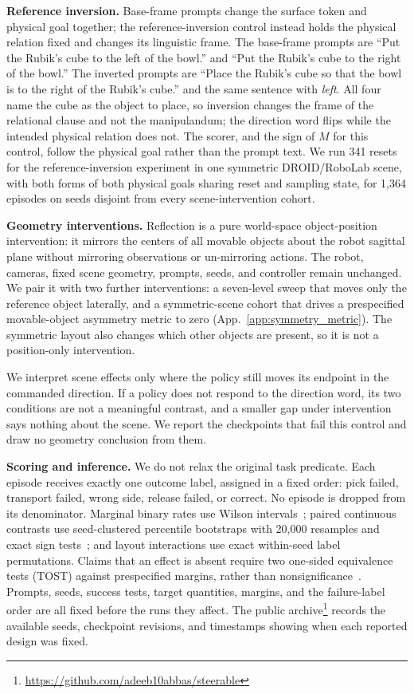 \documentclass[letterpaper,10pt,conference]{ieeeconf}%
\newcommand{\tightparagraph}[1]{\vspace{0.25em}\noindent\textbf{#1}}
\begin{document}
\tightparagraph{Reference inversion.}
Base-frame prompts change the surface token and physical goal together; the reference-inversion control instead holds the physical relation fixed and changes its linguistic frame.
The base-frame prompts are ``Put the Rubik's cube to the left of the bowl.'' and ``Put the Rubik's cube to the right of the bowl.''
The inverted prompts are ``Place the Rubik's cube so that the bowl is to the right of the Rubik's cube.'' and the same sentence with \emph{left}.
All four name the cube as the object to place, so inversion changes the frame of the relational clause and not the manipulandum; the direction word flips while the intended physical relation does not.
The scorer, and the sign of $M$ for this control, follow the physical goal rather than the prompt text.
We run 341 resets for the reference-inversion experiment in one symmetric DROID/RoboLab scene, with both forms of both physical goals sharing reset and sampling state, for 1,364 episodes on seeds disjoint from every scene-intervention cohort.

\tightparagraph{Geometry interventions.}
Reflection is a pure world-space object-position intervention: it mirrors the centers of all movable objects about the robot sagittal plane without mirroring observations or un-mirroring actions.
The robot, cameras, fixed scene geometry, prompts, seeds, and controller remain unchanged.
We pair it with two further interventions: a seven-level sweep that moves only the reference object laterally, and a symmetric-scene cohort that drives a prespecified movable-object asymmetry metric to zero (App.~\ref{app:symmetry_metric}).
The symmetric layout also changes which other objects are present, so it is not a position-only intervention.

We interpret scene effects only where the policy still moves its endpoint in the commanded direction.
If a policy does not respond to the direction word, its two conditions are not a meaningful contrast, and a smaller gap under intervention says nothing about the scene.
We report the checkpoints that fail this control and draw no geometry conclusion from them.

\tightparagraph{Scoring and inference.}
We do not relax the original task predicate.
Each episode receives exactly one outcome label, assigned in a fixed order: pick failed, transport failed, wrong side, release failed, or correct.
No episode is dropped from its denominator.
Marginal binary rates use Wilson intervals~\cite{wilson1927interval}; paired continuous contrasts use seed-clustered percentile bootstraps with 20,000 resamples and exact sign tests~\cite{efron1994bootstrap}; and layout interactions use exact within-seed label permutations.
Claims that an effect is absent require two one-sided equivalence tests (TOST) against prespecified margins, rather than nonsignificance~\cite{schuirmann1987tost}.
Prompts, seeds, success tests, target quantities, margins, and the failure-label order are all fixed before the runs they affect.
The public archive\footnote{\url{https://github.com/adeeb10abbas/steerable}} records the available seeds, checkpoint revisions, and timestamps showing when each reported design was fixed.
\end{document}
